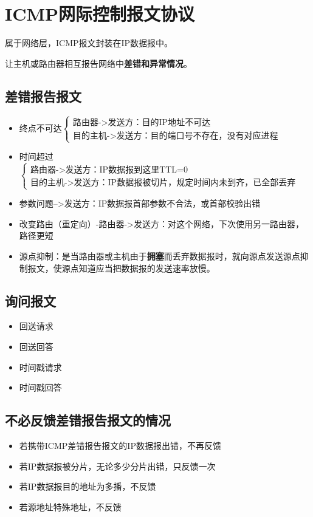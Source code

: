 \section{ICMP网际控制报文协议}
属于网络层，ICMP报文封装在IP数据报中。

让主机或路由器相互报告网络中\textbf{差错和异常情况}。

\subsection{差错报告报文}
\begin{itemize}
    \item 终点不可达\(\begin{cases}
        \text{路由器->发送方：目的IP地址不可达} \\ 
        \text{目的主机->发送方：目的端口号不存在，没有对应进程}
    \end{cases}\)
    \item 时间超过\(\begin{cases}
        \text{路由器->发送方：IP数据报到这里TTL=0} \\ 
        \text{目的主机->发送方：IP数据报被切片，规定时间内未到齐，已全部丢弃}
    \end{cases}\)
    \item 参数问题-->发送方：IP数据报首部参数不合法，或首部校验出错
    \item 改变路由（重定向）-路由器->发送方：对这个网络，下次使用另一路由器，路径更短
    \item 源点抑制：是当路由器或主机由于\textbf{拥塞}而丢弃数据报时，就向源点发送源点抑制报文，使源点知道应当把数据报的发送速率放慢。
\end{itemize}


\subsection{询问报文}
\begin{itemize}
    \item 回送请求
    \item 回送回答
    \item 时间戳请求
    \item 时间戳回答
\end{itemize}


\subsection{不必反馈差错报告报文的情况}
\begin{itemize}
    \item 若携带ICMP差错报告报文的IP数据报出错，不再反馈
    \item 若IP数据报被分片，无论多少分片出错，只反馈一次
    \item 若IP数据报目的地址为多播，不反馈
    \item 若源地址特殊地址，不反馈
\end{itemize}


